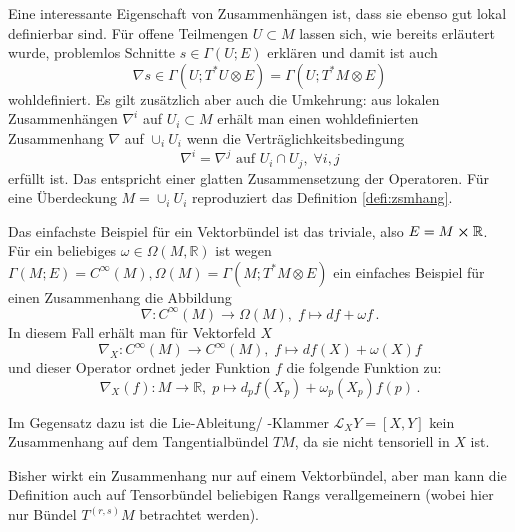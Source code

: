 \documentclass[../H_Analysis_main.tex]{subfiles}
\begin{document}
Eine interessante Eigenschaft von Zusammenhängen ist, dass sie ebenso gut lokal definierbar sind. Für offene Teilmengen $U \subset M$ lassen sich, wie bereits erläutert wurde, problemlos Schnitte $s \in \Gamma(U; E)$ erklären und damit ist auch
\begin{equation}
\nabla s \in \Gamma(U; T^*U \otimes E) = \Gamma(U; T^*M \otimes E)
\end{equation}
wohldefiniert. Es gilt zusätzlich aber auch die Umkehrung: aus lokalen Zusammenhängen $\nabla^i$ auf $U_i \subset M$ erhält man einen wohldefinierten Zusammenhang $\nabla$ auf $\cup_i U_i$ wenn die Verträglichkeitsbedingung
\begin{equation}
\nabla^i = \nabla^j \text{ auf } U_i \cap U_j, \; \forall i, j
\end{equation}
erfüllt ist. Das entspricht einer glatten Zusammensetzung der Operatoren. Für eine Überdeckung $M = \cup_i U_i$ reproduziert das Definition \ref{defi:zsmhang}.



\begin{bsp}
Das einfachste Beispiel für ein Vektorbündel ist das triviale, also $E = M \cross \mathbb{R}$. Für ein beliebiges $\omega \in \Omega(M, \mathbb{R})$ ist wegen $\Gamma(M; E) = C^\infty(M), \Omega(M) = \Gamma(M; T^* M \otimes E)$ ein einfaches Beispiel für einen Zusammenhang die Abbildung
\begin{equation*}
\nabla: C^\infty(M) \rightarrow \Omega(M), \; f \mapsto df + \omega f \, .
\end{equation*}
In diesem Fall erhält man für Vektorfeld $X$
\begin{equation*}
\nabla_X: C^\infty(M) \rightarrow C^\infty(M), \; f \mapsto df(X) + \omega(X) f
\end{equation*}
und dieser Operator ordnet jeder Funktion $f$ die folgende Funktion zu:
\begin{equation*}
\nabla_X(f): M \rightarrow \mathbb{R}, \; p \mapsto d_p f(X_p) + \omega_p(X_p) f(p) \, .
\end{equation*}

Im Gegensatz dazu ist die Lie-Ableitung/ -Klammer $\mathcal{L}_X Y = [X, Y]$ kein Zusammenhang auf dem Tangentialbündel $TM$, da sie nicht tensoriell in $X$ ist.
\end{bsp}



Bisher wirkt ein Zusammenhang nur auf einem Vektorbündel, aber man kann die Definition auch auf Tensorbündel beliebigen Rangs verallgemeinern (wobei hier nur Bündel $T^{(r, s)}M$ betrachtet werden).
\end{document}
